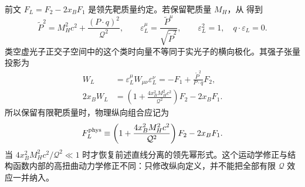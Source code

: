 \begin{derivation}[有限靶质量的纵向投影]
前文 $F_L=F_2-2x_BF_1$ 是领先靶质量约定。若保留靶质量 $M_H$，从 得到
\begin{equation*}
 \widetilde P^2=M_H^2c^2+\frac{(P\cdot q)^2}{\mathcal Q^2},\qquad
 \varepsilon_L^\mu=\frac{\widetilde P^\mu}{\sqrt{\widetilde P^2}},\qquad
 \varepsilon_L^2=1,\quad q\cdot\varepsilon_L=0.
\end{equation*}
类空虚光子正交子空间中的这个类时向量不等同于实光子的横向极化。其强子张量投影为
\begin{align*}
 W_L&=\varepsilon_L^\mu W_{\mu\nu}\varepsilon_L^\nu
 =-F_1+\frac{\widetilde P^2}{P\cdot q}F_2,\\
 2x_BW_L&=\left(1+\frac{4x_B^2M_H^2c^2}{\mathcal Q^2}\right)F_2-2x_BF_1.
\end{align*}
所以保留有限靶质量时，物理纵向组合应记为
\begin{equation}
 F_L^{\rm phys}\equiv
 \left(1+\frac{4x_B^2M_H^2c^2}{\mathcal Q^2}\right)F_2-2x_BF_1.
 \label{eq:dis-longitudinal-target-mass}
\end{equation}
当 $4x_B^2M_H^2c^2/\mathcal Q^2\ll1$ 时才恢复前述直线分离的领先幂形式。这个运动学修正与结构函数内部的高扭曲动力学修正不同：只修改纵向定义，并不能把全部有限 $\mathcal Q$ 效应一并纳入。
\end{derivation}

